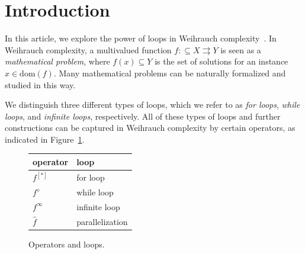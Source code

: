 \documentclass[11pt,a4paper]{amsart}
\theoremstyle{plain}
\theoremstyle{definition}
\theoremstyle{defC}
\theoremstyle{thmC}
\theoremstyle{plain}
\numberwithin{equation}{section}
\def\In{\subseteq}
\def\mto{\rightrightarrows}
\def\dom{{\mathrm{dom}}}
\begin{document}
\section{Introduction}

In this article, we explore the power of loops in Weihrauch complexity~\cite{BGP21}.
In Weihrauch complexity, a multivalued function $f:\In X\mto Y$ is seen as a {\em mathematical problem},
where $f(x)\In Y$ is the set of solutions for an instance $x\in\dom(f)$.
Many mathematical problems can be naturally formalized and studied in this way.

We distinguish three different types of loops, which we refer to as {\em for loops}, {\em while loops}, and {\em infinite loops},
respectively. All of these types of loops and further constructions 
can be captured in Weihrauch complexity by certain operators, as indicated
in Figure~\ref{fig:operators-loops}.

\begin{figure}[h]
	\centering
	\begin{tabular}{l|l}
		{\bf operator} & {\bf loop}\\\hline
		$f^{[*]}$ & for loop\\
		$f^\diamond$ & while loop\\
		$f^\infty$ & infinite loop\\
		$\widehat{f}$ & parallelization
	\end{tabular}
	\caption{Operators and loops.}
	\label{fig:operators-loops}
\end{figure}
\end{document}
